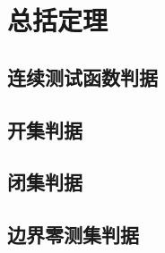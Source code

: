 \section{总括定理}
\label{b1:sec:1202}


\subsection{连续测试函数判据}
\label{b1:subsec:120201}

\subsection{开集判据}
\label{b1:subsec:120202}

\subsection{闭集判据}
\label{b1:subsec:120203}

\subsection{边界零测集判据}
\label{b1:subsec:120204}


